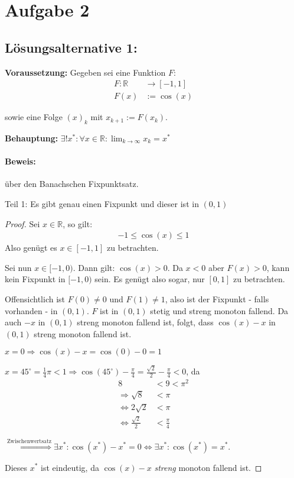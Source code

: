 \section*{Aufgabe 2}

\subsection*{Lösungsalternative 1:}

\textbf{Voraussetzung:} 
Gegeben sei eine Funktion $F$:
\begin{align*}
    F: \mathbb{R} &\rightarrow [-1, 1]\\
    F(x) &:= \cos(x)
\end{align*}

sowie eine Folge $(x)_k$ mit $x_{k+1} := F(x_k)$.

\textbf{Behauptung:} $\displaystyle \exists! x^*: \forall x \in \mathbb{R}: \lim_{k \rightarrow \infty} x_k = x^*$

\paragraph{Beweis:} über den Banachschen Fixpunktsatz.

Teil 1: Es gibt genau einen Fixpunkt und dieser ist in $(0,1)$
\begin{proof}
Sei $ x \in \mathbb{R}$, so gilt:
\begin{align*}
	-1 \leq \cos(x) \leq 1
\end{align*}
Also genügt es $x \in [-1, 1]$ zu betrachten.

Sei nun $x \in [-1, 0)$. Dann gilt: $\cos(x) > 0$. Da $x <0$ aber $F(x) > 0$,
kann kein Fixpunkt in $[-1, 0)$ sein. Es genügt also sogar,
nur $[0, 1]$ zu betrachten.

Offensichtlich ist $F(0) \neq 0$ und $F(1) \neq 1$, also ist der 
Fixpunkt - falls vorhanden - in $(0,1)$. $F$ ist in $(0,1)$ stetig
und streng monoton fallend. Da auch $-x$ in $(0,1)$ streng monoton
fallend ist, folgt, dass $\cos(x) - x$ in $(0,1)$ streng monoton 
fallend ist.

$x=0 \Rightarrow \cos(x) - x = \cos(0) - 0 = 1$

$x=45^\circ = \frac{1}{4} \pi < 1 \Rightarrow \cos(45^\circ) - \frac{\pi}{4} = \frac{\sqrt{2}}{2} - \frac{\pi}{4} <0$, da
\begin{align}
    8 &< 9 < \pi^2\\
    \Rightarrow \sqrt{8} &< \pi\\
    \Leftrightarrow 2 \sqrt{2} &< \pi\\
    \Leftrightarrow \frac{\sqrt{2}}{2} &< \frac{\pi}{4}
\end{align}

$\stackrel{\text{Zwischenwertsatz}}{\Rightarrow} \exists x^*: \cos(x^*) - x^* = 0 \Leftrightarrow \exists x^*: \cos(x^*) = x^*$.

Dieses $x^*$ ist eindeutig, da $\cos(x)-x$ \emph{streng} monoton fallend ist.
\end{proof}

